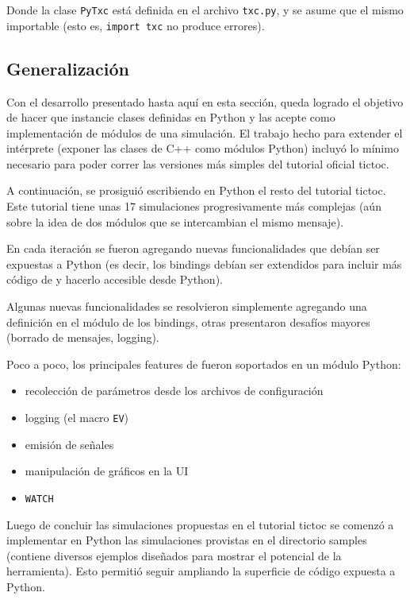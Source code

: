 \documentclass[]{article}
\begin{document}
\inputminted{c++}{codelistings/pytxc.cc}

Donde la clase \verb!PyTxc! está definida en el archivo \verb!txc.py!, y se
asume que el mismo importable (esto es, \verb!import txc! no produce errores).

\subsection{Generalización}

Con el desarrollo presentado hasta aquí en esta sección, queda logrado el
objetivo de hacer que \omnetpp{} instancie clases definidas en Python y las acepte
como implementación de módulos de una simulación. El trabajo hecho para
extender el intérprete (exponer las clases de C++ como módulos Python) incluyó
lo mínimo necesario para poder correr las versiones más simples del tutorial
oficial tictoc. 

A continuación, se prosiguió escribiendo en Python el resto del tutorial
tictoc. Este tutorial tiene unas 17 simulaciones progresivamente más complejas
(aún sobre la idea de dos módulos que se intercambian el mismo mensaje).

En cada iteración se fueron agregando nuevas funcionalidades que debían ser
expuestas a Python (es decir, los bindings debían ser extendidos para incluir
más código de \omnetpp{} y hacerlo accesible desde Python).

Algunas nuevas funcionalidades se resolvieron simplemente agregando una
definición en el módulo de los bindings, otras presentaron desafíos mayores
(borrado de mensajes, logging).

Poco a poco, los principales features de \omnetpp{} fueron soportados en un módulo
Python:

\begin{itemize}
    \item recolección de parámetros desde los archivos de configuración
    \item logging (el macro \verb!EV!)
    \item emisión de señales
    \item manipulación de gráficos en la UI
    \item \verb!WATCH!
\end{itemize}

Luego de concluir las simulaciones propuestas en el tutorial tictoc se comenzó
a implementar en Python las simulaciones provistas en el directorio samples
(contiene diversos ejemplos diseñados para mostrar el potencial de la
herramienta). Esto permitió seguir ampliando la superficie de código expuesta a
Python.
\end{document}
